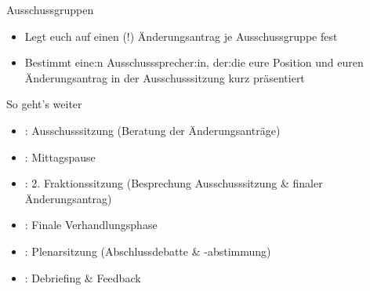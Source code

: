 \documentclass{beamer}
\begin{document}
\begin{frame}{Ausschussgruppen}
\vspace{-1.5cm}
\begin{itemize}
    \item Legt euch auf einen (!) Änderungsantrag je Ausschussgruppe fest
    \item Bestimmt eine:n Ausschusssprecher:in, der:die eure Position und euren Änderungsantrag in der Ausschusssitzung kurz präsentiert
\end{itemize}
\end{frame}


\begin{frame}{So geht's weiter}
\vspace{-1.5cm}
\begin{itemize}
    \item \timeAuss: Ausschusssitzung \newline (Beratung der Änderungsanträge)
    \item \timeMittag: Mittagspause
    \item \timeFrakTwo: 2. Fraktionssitzung (Besprechung Ausschusssitzung \& finaler Änderungsantrag)
    \item \timeFinVerh: Finale Verhandlungsphase
    \item \timePlenar: Plenarsitzung \newline (Abschlussdebatte \& -abstimmung)
    \item \timeDebr: Debriefing \& Feedback
\end{itemize}
\end{frame}
\end{document}
